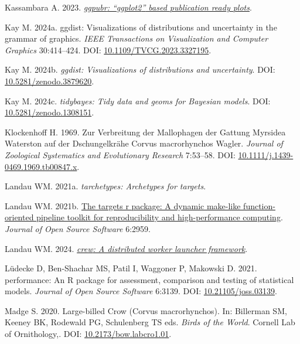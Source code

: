 \documentclass[10pt,a4paper]{article}
\newlength{\cslhangindent}
\newenvironment{CSLReferences}[2] %
 {\begin{list}{}{%
  \setlength{\itemindent}{0pt}
  \setlength{\leftmargin}{0pt}
  \setlength{\parsep}{0pt}
  \ifodd #1
   \setlength{\leftmargin}{\cslhangindent}
   \setlength{\itemindent}{-1\cslhangindent}
  \fi
  \setlength{\itemsep}{#2\baselineskip}}}
 {\end{list}}
\begin{document}
\begin{CSLReferences}{1}{0}
Kassambara A. 2023. \emph{\href{https://CRAN.R-project.org/package=ggpubr}{{ggpubr}: {``{ggplot2}''} based publication ready plots}}.

Kay M. 2024a. {ggdist}: Visualizations of distributions and uncertainty in the grammar of graphics. \emph{IEEE Transactions on Visualization and Computer Graphics} 30:414--424. DOI: \href{https://doi.org/10.1109/TVCG.2023.3327195}{10.1109/TVCG.2023.3327195}.

Kay M. 2024b. \emph{{ggdist}: Visualizations of distributions and uncertainty}. DOI: \href{https://doi.org/10.5281/zenodo.3879620}{10.5281/zenodo.3879620}.

Kay M. 2024c. \emph{{tidybayes}: Tidy data and geoms for {Bayesian} models}. DOI: \href{https://doi.org/10.5281/zenodo.1308151}{10.5281/zenodo.1308151}.

Klockenhoff H. 1969. Zur {Verbreitung} der {Mallophagen} der {Gattung} {Myrsidea} {Waterston} auf der {Dschungelkrähe} {Corvus} macrorhynchos {Wagler}. \emph{Journal of Zoological Systematics and Evolutionary Research} 7:53--58. DOI: \href{https://doi.org/10.1111/j.1439-0469.1969.tb00847.x}{10.1111/j.1439-0469.1969.tb00847.x}.

Landau WM. 2021a. \emph{{tarchetypes}: Archetypes for targets}.

Landau WM. 2021b. \href{https://doi.org/10.21105/joss.02959}{The targets r package: A dynamic make-like function-oriented pipeline toolkit for reproducibility and high-performance computing}. \emph{Journal of Open Source Software} 6:2959.

Landau WM. 2024. \emph{\href{https://CRAN.R-project.org/package=crew}{{crew}: A distributed worker launcher framework}}.

Lüdecke D, Ben-Shachar MS, Patil I, Waggoner P, Makowski D. 2021. {performance}: An {R} package for assessment, comparison and testing of statistical models. \emph{Journal of Open Source Software} 6:3139. DOI: \href{https://doi.org/10.21105/joss.03139}{10.21105/joss.03139}.

Madge S. 2020. Large-billed {Crow} ({Corvus} macrorhynchos). In: Billerman SM, Keeney BK, Rodewald PG, Schulenberg TS eds. \emph{Birds of the {World}}. Cornell Lab of Ornithology,. DOI: \href{https://doi.org/10.2173/bow.labcro1.01}{10.2173/bow.labcro1.01}.


\end{CSLReferences}
\end{document}
